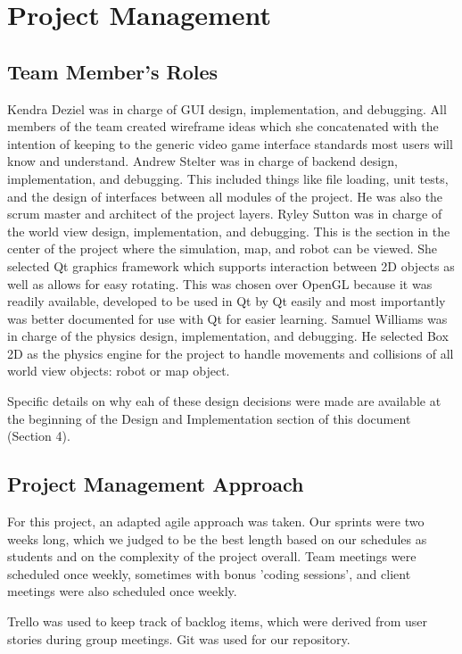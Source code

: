 

\chapter{Project Management}

\section{Team Member's Roles}
Kendra Deziel was in charge of GUI design, implementation, and debugging. All members of the team created wireframe ideas which she concatenated with the intention of keeping to the generic video game interface standards most users will know and understand.
Andrew Stelter was in charge of backend design, implementation, and debugging. This included things like file loading, unit tests, and the design of interfaces between all modules of the project. He was also the scrum master and architect of the project layers.
Ryley Sutton was in charge of the world view design, implementation, and debugging. This is the section in the center of the project where the simulation, map, and robot can be viewed. She selected Qt graphics framework which supports interaction between 2D objects as well as allows for easy rotating. This was chosen over OpenGL because it was readily available, developed to be used in Qt by Qt easily and most importantly was better documented for use with Qt for easier learning.  
Samuel Williams was in charge of the physics design, implementation, and debugging. He selected Box 2D as the physics engine for the project to handle movements and collisions of all world view objects: robot or map object.

Specific details on why eah of these design decisions were made are available at the beginning of the Design and Implementation section of this document (Section 4).


\section{Project  Management Approach}
For this project, an adapted agile approach was taken. Our sprints were two weeks long, which we judged to be the best length based on our schedules as students and on the complexity of the project overall. Team meetings were scheduled once weekly, sometimes with bonus 'coding sessions', and client meetings were also scheduled once weekly. 

Trello was used to keep track of backlog items, which were derived from user stories during group meetings. Git was used for our repository.

